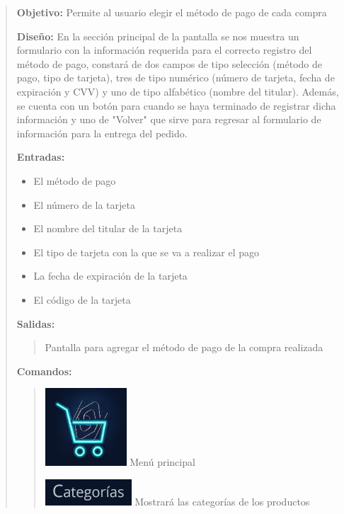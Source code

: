\documentclass[14pt]{article}
\begin{document}
                \begin{quote}
                    \textbf{Objetivo:} Permite al usuario elegir el método de pago de cada compra
                    
                    \textbf{Diseño:} En la sección principal de la pantalla se nos muestra un formulario con la información requerida para el correcto registro del método de pago, constará de dos campos de tipo selección (método de pago, tipo de tarjeta), tres de tipo numérico (número de tarjeta, fecha de expiración y CVV) y uno de tipo alfabético (nombre del titular). Además, se cuenta con un botón para cuando se haya terminado de registrar dicha información y uno de "Volver" que sirve para regresar al formulario de información para la entrega del pedido.
                    
                    \textbf{Entradas:} 
                        \begin{itemize}
                            \item El método de pago
                            \item El número de la tarjeta
                            \item El nombre del titular de la tarjeta
                            \item El tipo de tarjeta con la que se va a realizar el pago
                            \item La fecha de expiración de la tarjeta
                            \item El código de la tarjeta
                        \end{itemize}
                    
                    \textbf{Salidas:}
                        \begin{quote}
                            Pantalla para agregar el método de pago de la compra realizada
                        \end{quote}
                        
                    \newpage
                    \textbf{Comandos:}
                        \begin{quote}
                        \includegraphics[height=0.02\textwidth]{BotonMenuPrincipal.jpg}
                            \label{P7:BotonMenuPrincipal} Menú principal
                           
                            \includegraphics[height=0.02\textwidth]{BotonCategorias.jpg}
                            \label{P7:BotonCategorias} Mostrará las categorías de los productos
                           

\end{quote}
\end{quote}
\end{document}
